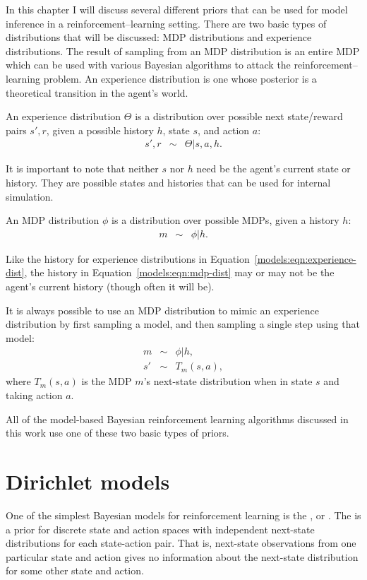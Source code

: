 In this chapter I will discuss several different priors that can be used for model inference in a reinforcement--learning setting. There are two basic types of distributions that will be discussed: MDP distributions and experience distributions. The result of sampling from an MDP distribution is an entire MDP which can be used with various Bayesian algorithms to attack the reinforcement--learning problem. An experience distribution is one whose posterior is a theoretical transition in the agent's world.

An experience distribution $\Theta$ is a distribution over possible next state/reward pairs $s',r$, given a possible history $h$, state $s$, and action $a$:
\begin{eqnarray}
\label{models:eqn:experience-dist} s', r &\sim& \Theta | s, a, h.
\end{eqnarray}

It is important to note that neither $s$ nor $h$ need be the agent's current state or history. They are possible states and histories that can be used for internal simulation.

An MDP distribution $\phi$ is a distribution over possible MDPs, given a history $h$:
\begin{eqnarray}
\label{models:eqn:mdp-dist} m &\sim& \phi|h.
\end{eqnarray}

Like the history for experience distributions in Equation~\ref{models:eqn:experience-dist}, the history in Equation~\ref{models:eqn:mdp-dist} may or may not be the agent's current history (though often it will be).

It is always possible to use an MDP distribution to mimic an experience distribution by first sampling a model, and then sampling a single step using that model:
\begin{eqnarray}
m &\sim& \phi|h,\\
s' &\sim& T_m(s,a),
\end{eqnarray}
where $T_m(s,a)$ is the MDP $m$'s next-state distribution when in state $s$ and taking action $a$.

All of the model-based Bayesian reinforcement learning algorithms discussed in this work use one of these two basic types of priors.


\section{Dirichlet models}

One of the simplest Bayesian models for reinforcement learning is the , or . The  is a prior for discrete state and action spaces with independent next-state distributions for each state-action pair. That is, next-state observations from one particular state and action gives no information about the next-state distribution for some other state and action.

